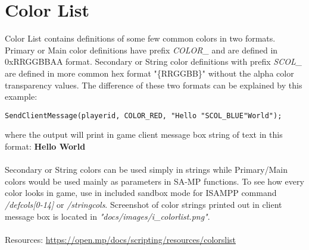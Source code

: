 \documentclass{article}
\begin{document}
\section{Color List}
Color List contains definitions of some few common colors in two formats. Primary or Main color definitions have prefix \textit{COLOR\_} and are defined in 0xRRGGBBAA format. Secondary or String color definitions with prefix \textit{SCOL\_} are defined in more common hex format "\{RRGGBB\}" without the alpha color transparency values. The difference of these two formats can be explained by this example:
\begin{verbatim}
SendClientMessage(playerid, COLOR_RED, "Hello "SCOL_BLUE"World");
\end{verbatim}
where the output will print in game client message box string of text in this format:
\textbf{\color{red}Hello \color{blue}World}\\
\\
Secondary or String colors can be used simply in strings while Primary/Main colors would be used mainly as parameters in SA-MP functions. To see how every color looks in game, use in included sandbox mode for ISAMPP command \textit{/defcols[0-14]} or \textit{/stringcols}. Screenshot of color strings printed out in client message box is located in \textit{"docs/images/i\_colorlist.png"}.
\\
\\Resources: \url{https://open.mp/docs/scripting/resources/colorslist}


\newpage
\end{document}
